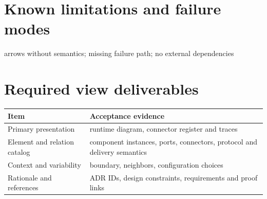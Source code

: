 \documentclass[10pt,letterpaper]{article}
\begin{document}
\section{Known limitations and failure modes}
arrows without semantics; missing failure path; no external dependencies

\section{Required view deliverables}
\small
\begin{tabularx}{\linewidth}{@{}YY@{}}
\toprule
\textbf{Item} & \textbf{Acceptance evidence} \\
\midrule
Primary presentation & runtime diagram, connector register and traces \\
Element and relation catalog & component instances, ports, connectors, protocol and delivery semantics \\
Context and variability & boundary, neighbors, configuration choices \\
Rationale and references & ADR IDs, design constraints, requirements and proof links \\
\bottomrule
\end{tabularx}
\normalsize
\end{document}
